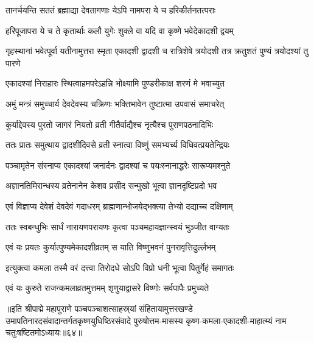 \twolineshloka
{तानर्चयन्ति सततं ब्रह्माद्या देवतागणाः}
{येऽपि नामपरा ये च हरिकीर्तनतत्पराः}%

\twolineshloka
{हरिपूजापरा ये च ते कृतार्थाः कलौ युगेः}
{शुक्ले वा यदि वा कृष्णे भवेदेकादशी द्वयम्}%

\threelineshloka
{गृहस्थानां भवेत्पूर्वा यतीनामुत्तरा स्मृता}
{एकादशी द्वादशी च रात्रिशेषे त्रयोदशी}
{तत्र क्रतुशतं पुण्यं त्रयोदश्यां तु पारणे}%

\twolineshloka
{एकादश्यां निराहारः स्थित्वाहमपरेऽहन्नि}
{भोक्ष्यामि पुण्डरीकाक्ष शरणं मे भवाच्युत}%

\twolineshloka
{अमुं मन्त्रं समुच्चार्य देवदेवस्य चक्रिणः}
{भक्तिभावेन तुष्टात्मा उपवासं समाचरेत्}%

\twolineshloka
{कुर्याद्देवस्य पुरतो जागरं नियतो व्रती}
{गीतैर्वाद्यैश्च नृत्यैश्च पुराणपठनादिभिः}%

\twolineshloka
{ततः प्रातः समुत्थाय द्वादशीदिवसे व्रती}
{स्नात्वा विष्णुं समभ्यर्च्य विधिवत्प्रयतेन्द्रियः}%

\twolineshloka
{पञ्चामृतेन संस्नाप्य एकादश्यां जनार्दनः}
{द्वादश्यां च पयःस्नानाद्धरेः सारूप्यमश्नुते}%

\twolineshloka
{अज्ञानतिमिरान्धस्य व्रतेनानेन केशव}
{प्रसीद सन्मुखो भूत्वा ज्ञानदृष्टिप्रदो भव}%

\twolineshloka
{एवं विज्ञाप्य देवेशं देवदेवं गदाधरम्}
{ब्राह्मणान्भोजयेद्भक्त्या तेभ्यो दद्याच्च दक्षिणाम्}%

\twolineshloka
{ततः स्वबन्धुभिः सार्धं नारायणपरायणः}
{कृत्वा पञ्चमहायज्ञान्स्वयं भुञ्जीत वाग्यतः}%

\twolineshloka
{एवं यः प्रयतः कुर्यात्पुण्यमेकादशीव्रतम्}
{स याति विष्णुभवनं पुनरावृत्तिदुर्ल्लभम्}%

\twolineshloka
{इत्युक्त्वा कमला तस्मै वरं दत्त्वा तिरोदधे}
{सोऽपि विप्रो धनी भूत्वा पितुर्गेहं समागतः}%


\twolineshloka
{एवं यः कुरुते राजन्कमलाव्रतमुत्तमम्}
{शृणुयाद्वासरे विष्णोः सर्वपापैः प्रमुच्यते}%

॥इति श्रीपाद्मे महापुराणे पञ्चपञ्चाशत्साहस्र्यां संहितायामुत्तरखण्डे उमापतिनारदसंवादान्तर्गतकृष्णयुधिष्ठिरसंवादे पुरुषोत्तम-मासस्य कृष्ण-कमला-एकादशी-माहात्म्यं नाम चतुःषष्टितमोऽध्यायः॥६४॥


\hyperref[sec:ekadashi_mahatmyam_padma_puranam]{\closesub}
\clearpage

\label{sec:padma-purushottama-masasya shukla-kamada}



